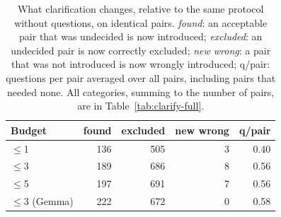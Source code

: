 \begin{table}[t]\centering\small\setlength{\tabcolsep}{3pt}
\begin{tabular}{lrrrr}\toprule
Budget & found & excluded & new wrong & q/pair \\ \midrule
$\le$1 & 136 & 505 & 3 & 0.40 \\
$\le$3 & 189 & 686 & 8 & 0.56 \\
$\le$5 & 197 & 691 & 7 & 0.56 \\
$\le$3 (Gemma) & 222 & 672 & 0 & 0.58 \\
\bottomrule\end{tabular}
\caption{What clarification changes, relative to the same protocol without questions, on identical pairs. \emph{found}: an acceptable pair that was undecided is now introduced; \emph{excluded}: an undecided pair is now correctly excluded; \emph{new wrong}: a pair that was not introduced is now wrongly introduced; q/pair: questions per pair averaged over all pairs, including pairs that needed none. All categories, summing to the number of pairs, are in Table~\ref{tab:clarify-full}.}
\label{tab:clarify}\end{table}